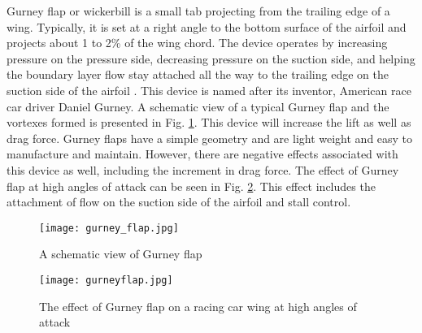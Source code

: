 \documentclass[fleqn,10pt]{SelfArx} %
\begin{document}
Gurney flap or wickerbill is a small tab projecting from the trailing edge of a wing. Typically, it is set at a right angle to the bottom surface of the airfoil and projects about 1 to 2\% of the wing chord. The device operates by increasing pressure on the pressure side, decreasing pressure on the suction side, and helping the boundary layer flow stay attached all the way to the trailing edge on the suction side of the airfoil \cite{Meena2018}. This device is named after its inventor, American race car driver Daniel Gurney. A schematic view of a typical Gurney flap and the vortexes formed is presented in Fig. \ref{fig_Gurney_flap_1}. This device will increase the lift as well as drag force. Gurney flaps have a simple geometry and are light weight and easy to manufacture and maintain. However, there are negative effects associated with this device as well, including the increment in drag force. The effect of Gurney flap at high angles of attack can be seen in Fig. \ref{fig_gurney_effect_1}. This effect includes the attachment of flow on the suction side of the airfoil and stall control.
\begin{figure}[ht]
\centering
\texttt{[image: gurney\_flap.jpg]}
\caption{A schematic view of Gurney flap \cite{Joshi2016}}
\label{fig_Gurney_flap_1}
\end{figure}
\begin{figure}[ht]
\centering
\texttt{[image: gurneyflap.jpg]}
\caption{The effect of Gurney flap on a racing car wing at high angles of attack}
\label{fig_gurney_effect_1}
\end{figure}
\end{document}
